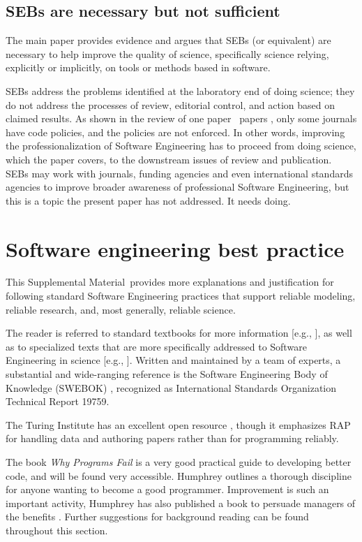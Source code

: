 \documentclass[10pt,a4paper]{article}
\def\supplement{Supplemental Material}
\def\citeeg#1{[e.g., \citenum{#1}]}
\def\plural#1#2{\ifnum #1=1 
	one #2%
\else
	\the#1\ #2s%
\fi}
\begin{document}
\subsection{SEBs are necessary but not sufficient}
The main paper provides evidence and argues that SEBs (or equivalent) are necessary to help improve the quality of science, specifically science relying, explicitly or implicitly, on tools or methods based in software. 

SEBs address the problems identified at the laboratory end of doing science; they do not address the processes of review, editorial control, and action based on claimed results. As shown in the review of \plural{\dataN}{paper}, only some journals have code policies, and the policies are not enforced. In other words, improving the professionalization of Software Engineering has to proceed from doing science, which the paper covers, to the downstream issues of review and publication. SEBs may work with journals, funding agencies and even international standards agencies to improve broader awareness of professional Software Engineering, but this is a topic the present paper has not addressed. It needs doing.

\section{Software engineering best practice}
\label{supplement-best-practice}

This \supplement\ provides more explanations and justification for following standard Software Engineering practices that support reliable modeling, reliable research, and, most generally, reliable science. 

The reader is referred to standard textbooks for more information \citeeg{sommerville,knight}, as well as to specialized texts that are more specifically addressed to Software Engineering in science \citeeg{cosmos}. Written and maintained by a team of experts, a substantial and wide-ranging reference is the Software Engineering Body of Knowledge (SWEBOK) \cite{swebok}, recognized as International Standards Organization Technical Report 19759.

The Turing Institute has an excellent open resource \cite{turing-way}, though it emphasizes RAP for handling data and authoring papers rather than for programming reliably.

The book \emph{Why Programs Fail\/} \cite{wpf} is a very good practical guide to developing better code, and will be found very accessible. Humphrey \cite{humphrey} outlines a thorough discipline for anyone wanting to become a good programmer. Improvement is such an important activity, Humphrey has also published a book to persuade managers of the benefits \cite{managers}. Further suggestions for background reading can be found throughout this section.
\end{document}
